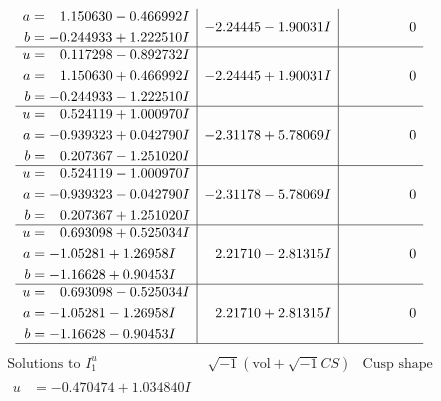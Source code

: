 \documentclass[1p]{elsarticle_modified}
\theoremstyle{definition}
\newcommand{\I}{\sqrt{-1}}
\begin{document}
$$\begin{array}{c|c|c}
\begin{aligned}
a &= \phantom{-}1.150630 - 0.466992 I \\
b &= -0.244933 + 1.222510 I\end{aligned}
 & -2.24445 - 1.90031 I & \phantom{-0.000000 } 0 \\ \hline\begin{aligned}
u &= \phantom{-}0.117298 - 0.892732 I \\
a &= \phantom{-}1.150630 + 0.466992 I \\
b &= -0.244933 - 1.222510 I\end{aligned}
 & -2.24445 + 1.90031 I & \phantom{-0.000000 } 0 \\ \hline\begin{aligned}
u &= \phantom{-}0.524119 + 1.000970 I \\
a &= -0.939323 + 0.042790 I \\
b &= \phantom{-}0.207367 - 1.251020 I\end{aligned}
 & -2.31178 + 5.78069 I & \phantom{-0.000000 } 0 \\ \hline\begin{aligned}
u &= \phantom{-}0.524119 - 1.000970 I \\
a &= -0.939323 - 0.042790 I \\
b &= \phantom{-}0.207367 + 1.251020 I\end{aligned}
 & -2.31178 - 5.78069 I & \phantom{-0.000000 } 0 \\ \hline\begin{aligned}
u &= \phantom{-}0.693098 + 0.525034 I \\
a &= -1.05281 + 1.26958 I \\
b &= -1.16628 + 0.90453 I\end{aligned}
 & \phantom{-}2.21710 - 2.81315 I & \phantom{-0.000000 } 0 \\ \hline\begin{aligned}
u &= \phantom{-}0.693098 - 0.525034 I \\
a &= -1.05281 - 1.26958 I \\
b &= -1.16628 - 0.90453 I\end{aligned}
 & \phantom{-}2.21710 + 2.81315 I & \phantom{-0.000000 } 0\\
 \hline 
 \end{array}$$\newpage$$\begin{array}{c|c|c}  
\text{Solutions to }I^u_{1}& \I (\text{vol} + \sqrt{-1}CS) & \text{Cusp shape}\\
 \hline 
\begin{aligned}
u &= -0.470474 + 1.034840 I \\

\end{aligned}
\end{array}$$
\end{document}
